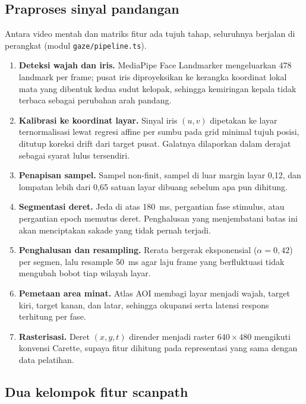 \documentclass{article}
\begin{document}
\subsection*{Praproses sinyal pandangan}
\label{sec:tp-prepro}

Antara video mentah dan matriks fitur ada tujuh tahap, seluruhnya berjalan di perangkat
(modul \texttt{gaze/pipeline.ts}).

\begin{enumerate}
\item \textbf{Deteksi wajah dan iris.} MediaPipe Face Landmarker mengeluarkan 478 landmark
      per frame; pusat iris diproyeksikan ke kerangka koordinat lokal mata yang dibentuk
      kedua sudut kelopak, sehingga kemiringan kepala tidak terbaca sebagai perubahan arah
      pandang.
\item \textbf{Kalibrasi ke koordinat layar.} Sinyal iris $(u,v)$ dipetakan ke layar
      ternormalisasi lewat regresi affine per sumbu pada grid minimal tujuh posisi, ditutup
      koreksi drift dari target pusat. Galatnya dilaporkan dalam derajat sebagai syarat lulus
      tersendiri.
\item \textbf{Penapisan sampel.} Sampel non-finit, sampel di luar margin layar 0,12, dan
      lompatan lebih dari 0,65 satuan layar dibuang sebelum apa pun dihitung.
\item \textbf{Segmentasi deret.} Jeda di atas 180~ms, pergantian fase stimulus, atau
      pergantian epoch memutus deret. Penghalusan yang menjembatani batas ini akan
      menciptakan sakade yang tidak pernah terjadi.
\item \textbf{Penghalusan dan resampling.} Rerata bergerak eksponensial
      ($\alpha = 0{,}42$) per segmen, lalu resample 50~ms agar laju frame yang berfluktuasi
      tidak mengubah bobot tiap wilayah layar.
\item \textbf{Pemetaan area minat.} Atlas AOI membagi layar menjadi wajah, target kiri,
      target kanan, dan latar, sehingga okupansi serta latensi respons terhitung per fase.
\item \textbf{Rasterisasi.} Deret $(x,y,t)$ dirender menjadi raster $640 \times 480$
      mengikuti konvensi Carette, supaya fitur dihitung pada representasi yang sama dengan
      data pelatihan.
\end{enumerate}

\subsection*{Dua kelompok fitur scanpath}
\label{sec:tp-fitur}
\end{document}
